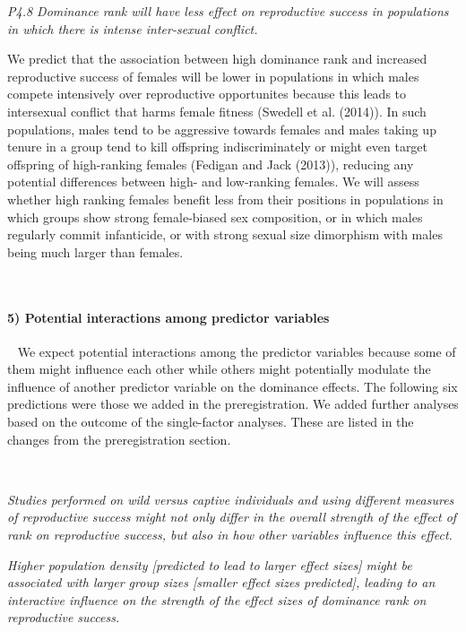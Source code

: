 \documentclass[
]{article}
\begin{document}
\emph{P4.8 Dominance rank will have less effect on reproductive success
in populations in which there is intense inter-sexual conflict.}

We predict that the association between high dominance rank and
increased reproductive success of females will be lower in populations
in which males compete intensively over reproductive opportunites
because this leads to intersexual conflict that harms female fitness
(Swedell et al. (2014)). In such populations, males tend to be
aggressive towards females and males taking up tenure in a group tend to
kill offspring indiscriminately or might even target offspring of
high-ranking females (Fedigan and Jack (2013)), reducing any potential
differences between high- and low-ranking females. We will assess
whether high ranking females benefit less from their positions in
populations in which groups show strong female-biased sex composition,
or in which males regularly commit infanticide, or with strong sexual
size dimorphism with males being much larger than females.

~

\hypertarget{potential-interactions-among-predictor-variables}{%
\paragraph{\texorpdfstring{\textbf{5) Potential interactions among
predictor
variables}}{5) Potential interactions among predictor variables}}\label{potential-interactions-among-predictor-variables}}

~ We expect potential interactions among the predictor variables because
some of them might influence each other while others might potentially
modulate the influence of another predictor variable on the dominance
effects. The following six predictions were those we added in the
preregistration. We added further analyses based on the outcome of the
single-factor analyses. These are listed in the changes from the
preregistration section.

~

\emph{Studies performed on wild versus captive individuals and using
different measures of reproductive success might not only differ in the
overall strength of the effect of rank on reproductive success, but also
in how other variables influence this effect.}

\emph{Higher population density {[}predicted to lead to larger effect
sizes{]} might be associated with larger group sizes {[}smaller effect
sizes predicted{]}, leading to an interactive influence on the strength
of the effect sizes of dominance rank on reproductive success.}
\end{document}
